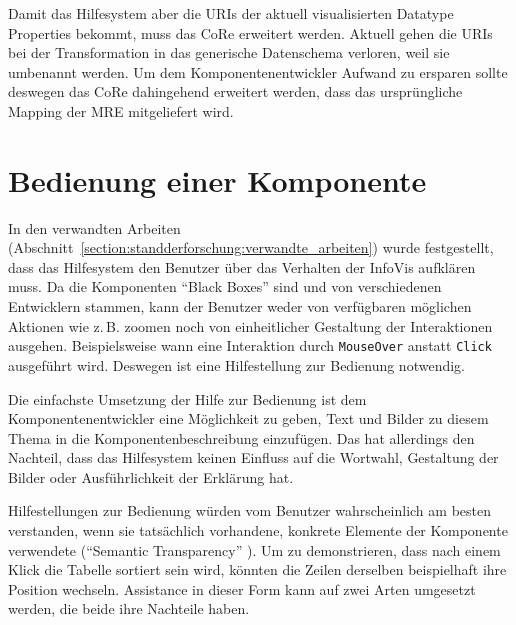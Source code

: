 \documentclass[
	headsepline,
	footsepline,
	fontsize=12pt,
	bibliography=totoc
]{scrbook}
\begin{document}

Damit das Hilfesystem aber die URIs der aktuell visualisierten Datatype Properties bekommt, muss das CoRe erweitert werden. Aktuell gehen die URIs bei der Transformation in das generische Datenschema verloren, weil sie umbenannt werden. Um dem Komponentenentwickler Aufwand zu ersparen sollte deswegen das CoRe dahingehend erweitert werden, dass das ursprüngliche Mapping der MRE mitgeliefert wird.


\section{Bedienung einer Komponente}
\label{section:konzeption:bedienung}

In den verwandten Arbeiten (Abschnitt~\ref{section:standderforschung:verwandte_arbeiten}) wurde festgestellt, dass das Hilfesystem den Benutzer über das Verhalten der InfoVis aufklären muss. Da die Komponenten \enquote{Black Boxes} sind und von verschiedenen Entwicklern stammen, kann der Benutzer weder von verfügbaren möglichen Aktionen wie z.\,B. zoomen noch von einheitlicher Gestaltung der Interaktionen ausgehen. Beispielsweise wann eine Interaktion durch \texttt{MouseOver} anstatt \texttt{Click} ausgeführt wird. Deswegen ist eine Hilfestellung zur Bedienung notwendig.


Die einfachste Umsetzung der Hilfe zur Bedienung ist dem Komponentenentwickler eine Möglichkeit zu geben, Text und Bilder zu diesem Thema in die Komponentenbeschreibung einzufügen. Das hat allerdings den Nachteil, dass das Hilfesystem keinen Einfluss auf die Wortwahl, Gestaltung der Bilder oder Ausführlichkeit der Erklärung hat.

Hilfestellungen zur Bedienung würden vom Benutzer wahrscheinlich am besten verstanden, wenn sie tatsächlich vorhandene, konkrete Elemente der Komponente verwendete (\enquote{Semantic Transparency} \cite{Kohlhase2009}). Um zu demonstrieren, dass nach einem Klick die Tabelle sortiert sein wird, könnten die Zeilen derselben beispielhaft ihre Position wechseln. Assistance in dieser Form kann auf zwei Arten umgesetzt werden, die beide ihre Nachteile haben.
\end{document}
